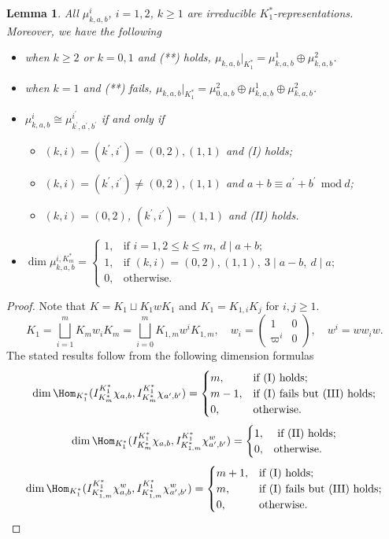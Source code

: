 \documentclass[11pt,reqno]{amsart}
\renewcommand{\mod}{\ \mathrm{mod}\ }\renewcommand{\Re}{{\mathrm{Re}}}
\theoremstyle{plain}
\newtheorem{lem}[thm]{Lemma}  \newtheorem{prop}[thm]{Proposition}
\theoremstyle{remark} \newtheorem{remark}[thm]{Remark}
\theoremstyle{definition} \newtheorem{exercise}[thm]{Exercise}
\theoremstyle{definition} \newtheorem{example}[thm]{Example} \newtheorem{condition}[thm]{Condition}
\numberwithin{equation}{section}
\renewcommand{\-}{\text{--}}
\begin{document}
\begin{lem}\label{irreII} All $\mu_{k,a,b}^i$, $i=1,2$, $k\geq1$ are irreducible $K_1^*$-representations. Moreover, we have the following
\begin{itemize}
 \item when $k\geq 2$ or $k=0,1$ and (**) holds, $\mu_{k,a,b}|_{K_1^*}=\mu_{k,a,b}^1\oplus \mu_{k,a,b}^2$.
 \item when $k=1$ and (**) fails, $\mu_{k,a,b}|_{K_1^*}=\mu_{0,a,b}^2\oplus \mu_{k,a,b}^1\oplus \mu_{k,a,b}^2$.
\item $\mu_{k,a,b}^i\cong \mu_{k^\prime,a^\prime,b^\prime}^{i^\prime}$ if and only if 
\begin{itemize}
\item $(k,i)=(k^\prime,i^\prime)=(0,2), (1,1)$ and (I) holds;
 \item $(k,i)=(k^\prime,i^\prime)\neq (0,2), (1,1)$ and $a+b\equiv a^\prime+b^\prime\ \mod d$;
\item $(k,i)=(0,2)$, $(k^\prime,i^\prime)=(1,1)$ and (II) holds.
   \end{itemize}
\item $\dim \mu_{k,a,b}^{i,K_m^*}=\begin{cases} 1, & \text{if } i=1, 2\leq k\leq m,\ d\mid a+b;\\ 
 1, & \text{if } (k,i)=(0,2), (1,1),\ 3\mid a-b,\ d\mid a;\\
0, & \text{otherwise.}\end{cases}$
\end{itemize}
\end{lem}
\begin{proof}
Note that $K=K_1\sqcup K_1wK_1$ and $K_1=K_{1,i} K_{j}$ for $i,j\geq1$.
\[K_1=\bigsqcup_{i=1}^m K_mw_iK_m=\bigsqcup_{i=0}^mK_{1,m}w^iK_{1,m},\quad w_i=\begin{pmatrix} 1 & 0\\ \varpi^i & 0\end{pmatrix},\quad w^i=ww_iw.\]
The stated results follow from the following dimension formulas \[\dim\Hom_{K_1^*}(I_{K_m^*}^{K_1^*}\chi_{a,b}, I_{K_{m}^*}^{K_1^*}\chi_{a^\prime,b^\prime})=\begin{cases} m, & \text{if (I) holds};\\
m-1, & \text{if (I) fails but (III) holds};\\
0, & \text{otherwise.}\end{cases}\]
\[\dim\Hom_{K_1^*}(I_{K_m^*}^{K_1^*}\chi_{a,b}, I_{K_{1,m}^*}^{K_1^*}\chi^w_{a^\prime,b^\prime})=\begin{cases} 1, & 
\text{ if (II) holds};\\
0, & \text{otherwise.}\end{cases}\]
\[\dim\Hom_{K_1^*}(I_{K_{1,m}^*}^{K_1^*}\chi^w_{a,b}, I_{K_{1,m}^*}^{K_1^*}\chi^w_{a^\prime,b^\prime})=\begin{cases} m+1, & 
\text{if (I) holds};\\
m, & \text{if (I) fails but (III) holds};\\
0, & \text{otherwise.}\end{cases}\]
\end{proof}
\end{document}
